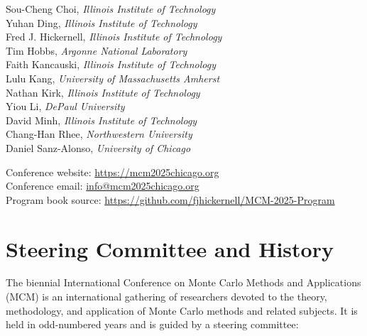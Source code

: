 \documentclass[12pt,lettersize,oneside]{book} %
\begin{document}
Sou-Cheng Choi, \emph{Illinois Institute of Technology} \\
Yuhan Ding, \emph{Illinois Institute of Technology} \\
Fred J. Hickernell, \emph{Illinois Institute of Technology} \\
Tim Hobbs, \emph{Argonne National Laboratory} \\
Faith Kancauski, \emph{Illinois Institute of Technology} \\
Lulu Kang, \emph{University of Massachusetts Amherst} \\
Nathan Kirk, \emph{Illinois Institute of Technology} \\
Yiou Li, \emph{DePaul University} \\
David Minh, \emph{Illinois Institute of Technology} \\
Chang-Han Rhee, \emph{Northwestern University} \\
Daniel Sanz-Alonso, \emph{University of Chicago}



\clearpage

Conference website: \url{https://mcm2025chicago.org} \\
Conference email: \url{info@mcm2025chicago.org} \\
Program book source: \url{https://github.com/fjhickernell/MCM-2025-Program}



\section{Steering Committee and History} \label{steer_com}


The biennial International Conference on Monte Carlo Methods and Applications (MCM) is an international gathering of researchers devoted to the theory, methodology, and application of Monte Carlo methods and related subjects. It is held in odd-numbered years and is guided by a steering committee:


\end{document}
